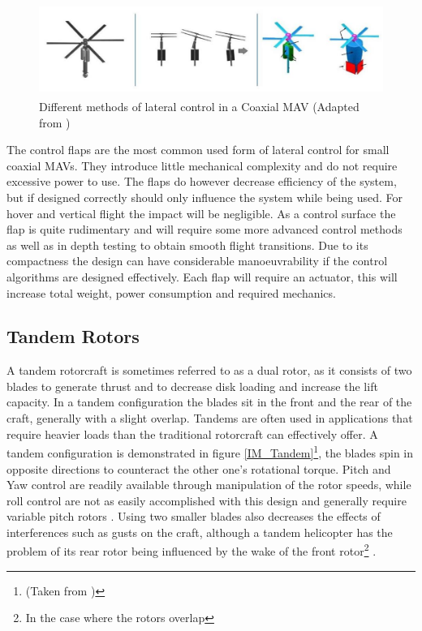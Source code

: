 \begin{figure}[H]
	\centering
	\includegraphics[height = 3cm]{Images/Literature/Coaxial_Configs}     
	\caption{Different methods of lateral control in a Coaxial MAV (Adapted from \cite{Bohorquez})}
	\label{IM_Coaxial_Variations}
\end{figure}

The control flaps are the most common used form of lateral control for small coaxial MAVs. They introduce little mechanical complexity and do not require excessive power to use. The flaps do however decrease efficiency of the system, but if designed correctly should only influence the system while being used. For hover and vertical flight the impact will be negligible. As a control surface the flap is quite rudimentary and will require some more advanced control methods as well as in depth testing to obtain smooth flight transitions. Due to its compactness the design can have considerable manoeuvrability if the control algorithms are designed effectively. Each flap will require an actuator, this will increase total weight, power consumption and required mechanics. 

\subsection{Tandem Rotors}

A tandem rotorcraft is sometimes referred to as a dual rotor, as it consists of two blades to generate thrust and to decrease disk loading and increase the lift capacity. In a tandem configuration the blades sit in the front and the rear of the craft, generally with a slight overlap. Tandems are often used in applications that require heavier loads than the traditional rotorcraft can effectively offer. A tandem configuration is demonstrated in figure \ref{IM_Tandem}\footnote{(Taken from \cite{Bee})}, the blades spin in opposite directions to counteract the other one's rotational torque. Pitch and Yaw control are readily available through manipulation of the rotor speeds, while roll control are not as easily accomplished with this design and generally require variable pitch rotors \cite{Oh2005}. Using two smaller blades also decreases the effects of interferences such as gusts on the craft, although a tandem helicopter has the problem of its rear rotor being influenced by the wake of the front rotor\footnote{In the case where the rotors overlap} \cite{Camrad1}. 

